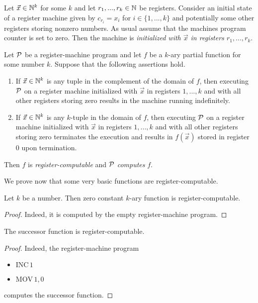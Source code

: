 \documentclass[10pt]{amsart}
\begin{document}
\begin{definition}
	Let $\vec{x}\in {\mathbb N}^k$ for some $k$ and let $r_1,...,r_k \in {\mathbb N}$ be registers. Consider an initial state of a register machine given by $c_{r_i} = x_{i}$ for $i \in \{1,...,k\}$ and potentially some other registers storing nonzero numbers. As usual assume that the machines program counter is set to zero. Then the machine is \textit{initialized with $\vec{x}$ in registers $r_1,...,r_k$}.
\end{definition}

\begin{definition}
	Let ${\mathcal P}$ be a register-machine program and let $f$ be a $k$-ary partial function for some number $k$. Suppose that the following assertions hold.
	\begin{enumerate}[label=\textbf{(\arabic*)}, leftmargin=3.0em]
		\item If $\vec{x}\in {\mathbb N}^k$ is any tuple in the complement of the domain of $f$, then executing ${\mathcal P}$ on a register machine initialized with $\vec{x}$ in registers $1,...,k$ and with all other registers storing zero results in the machine running indefinitely.
		\item If $\vec{x} \in {\mathbb N}^k$ is any $k$-tuple in the domain of $f$, then executing ${\mathcal P}$ on a register machine initialized with $\vec{x}$ in registers $1,...,k$ and with all other registers storing zero terminates the execution and results in $f(\vec{x})$ stored in register $0$ upon termination.
	\end{enumerate}
	Then $f$ is \textit{register-computable} and ${\mathcal P}$ \textit{computes} $f$.
\end{definition}
\noindent
We prove now that some very basic functions are register-computable.

\begin{fact}\label{fact:zero_constant_function_is_register_computable}
	Let $k$ be a number. Then zero constant $k$-ary function is register-computable.
\end{fact}
\begin{proof}
	Indeed, it is computed by the empty register-machine program.
\end{proof}

\begin{fact}\label{fact:successor_is_register_computable}
	The successor function is register-computable.
\end{fact}
\begin{proof}
	Indeed, the register-machine program
	\begin{itemize}
		\item[] $\mathrm{INC}\,1$
		\item[] $\mathrm{MOV}\,1,0$
	\end{itemize}
	computes the successor function.
\end{proof}
\end{document}

